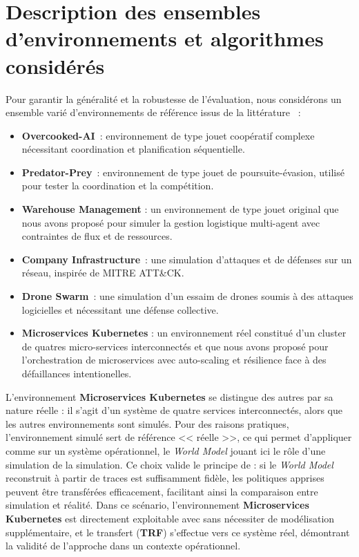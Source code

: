 \section{Description des ensembles d'environnements et algorithmes considérés}

Pour garantir la généralité et la robustesse de l'évaluation, nous considérons un ensemble varié d'environnements de référence issus de la littérature ~:
\begin{itemize}
  \item \textbf{Overcooked-AI}~\cite{overcookedai}: environnement de type jouet coopératif complexe nécessitant coordination et planification séquentielle.
  \item \textbf{Predator-Prey}~\cite{lowe2017multi}: environnement  de type jouet de poursuite-évasion, utilisé pour tester la coordination et la compétition.
  \item \textbf{Warehouse Management} : un environnement  de type jouet original que nous avons proposé pour simuler la gestion logistique multi-agent avec contraintes de flux et de ressources.
  \item \textbf{Company Infrastructure}~\cite{cyberbattlesim}: une simulation d'attaques et de défenses sur un réseau, inspirée de MITRE ATT\&CK.
  \item \textbf{Drone Swarm}~\cite{cage_challenge_3_announcement}: une simulation d'un essaim de drones soumis à des attaques logicielles et nécessitant une défense collective.
  \item \textbf{Microservices Kubernetes} : un environnement réel constitué d'un cluster de quatres micro-services interconnectés et que nous avons proposé pour l'orchestration de microservices avec auto-scaling et résilience face à des défaillances intentionelles.
\end{itemize}

L'environnement \textbf{Microservices Kubernetes} se distingue des autres par sa nature réelle : il s'agit d'un système de quatre services interconnectés, alors que les autres environnements sont simulés. Pour des raisons pratiques, l'environnement simulé sert de référence << réelle >>, ce qui permet d'appliquer  comme sur un système opérationnel, le \textit{World Model} jouant ici le rôle d'une simulation de la simulation. Ce choix valide le principe de  : si le \textit{World Model} reconstruit à partir de traces est suffisamment fidèle, les politiques apprises peuvent être transférées efficacement, facilitant ainsi la comparaison entre simulation et réalité. Dans ce scénario, l'environnement \textbf{Microservices Kubernetes} est directement exploitable avec  sans nécessiter de modélisation supplémentaire, et le transfert (\textbf{TRF}) s'effectue vers ce système réel, démontrant la validité de l'approche dans un contexte opérationnel.

